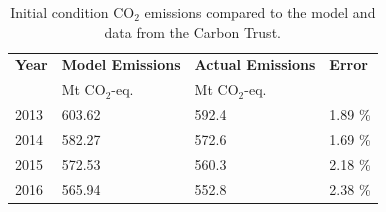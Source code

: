 \begin{table}[H]
	\caption{Initial condition CO$_2$ emissions compared to the model and data from the Carbon Trust\cite{carbon_brief_carbon_2018}.}
	\vspace{0.1in}
	\begin{tabularx}{\textwidth}{p{} p{} p{} p{}}
		\hline
\textbf{Year} & \textbf{Model Emissions} & \textbf{Actual Emissions} & \textbf{Error} \\
  & Mt CO$_2$-eq. & Mt CO$_2$-eq. &  \\
\hline
2013 & 603.62 & 592.4 & 1.89 \% \\
2014 & 582.27 & 572.6 & 1.69 \% \\
2015 & 572.53 & 560.3 & 2.18 \% \\
2016 & 565.94 & 552.8 & 2.38 \% \\
\hline 
	\end{tabularx}
\label{ic-co2}
\end{table}
